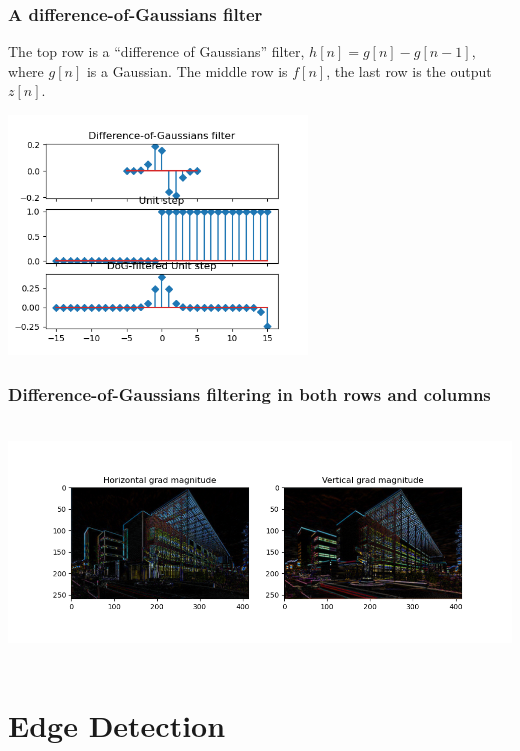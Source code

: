 \documentclass{beamer}
\begin{document}
\begin{frame}
  \frametitle{A difference-of-Gaussians filter}

  The top row is a ``difference of Gaussians'' filter,
  $h[n]=g[n]-g[n-1]$, where $g[n]$ is a Gaussian.  The middle row is
  $f[n]$, the last row is the output $z[n]$.
  \centerline{\includegraphics[height=2.5in]{mp3fig7.png}}
\end{frame}

\begin{frame}
  \frametitle{Difference-of-Gaussians filtering in both rows and columns}
      
  \centerline{\includegraphics[height=2.5in]{mp3fig8.png}}
\end{frame}

\section[Edges]{Edge Detection}
\setcounter{subsection}{1}
\end{document}
